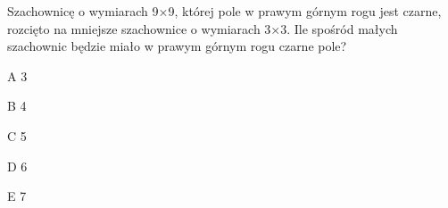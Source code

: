 \begin{tresc}
Szachownicę o wymiarach 9×9, której pole w prawym górnym rogu jest czarne, rozcięto na mniejsze szachownice o wymiarach 3×3. Ile spośród małych szachownic będzie miało w prawym górnym rogu czarne pole?
\end{tresc}
\begin{wariant}{A} 3 \end{wariant}
\begin{wariant}{B} 4 \end{wariant}
\begin{wariant}{C} 5 \end{wariant}
\begin{wariant}{D} 6 \end{wariant}
\begin{wariant}{E} 7 \end{wariant}
